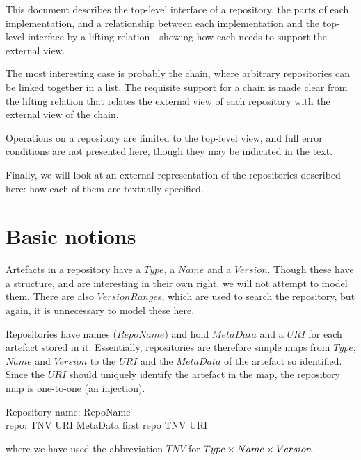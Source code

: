 \documentclass[a4paper,titlepage,twoside,12pt]{article}
\begin{document}
This document describes the top-level interface of a repository, the parts of each implementation, and a relationship between each implementation and the top-level interface by a lifting relation---showing how each needs to support the external view.

The most interesting case is probably the chain, where arbitrary repositories can be linked together in a list. The requisite support for a chain is made clear from the lifting relation that relates the external view of each repository with the external view of the chain.

Operations on a repository are limited to the top-level view, and full error conditions are not presented here, though they may be indicated in the text.

Finally, we will look at an external representation of the repositories described here: how each of them are textually specified.

\section{Basic notions}
Artefacts in a repository have a $Type$, a $Name$ and a $Version$. Though these have a structure, and are interesting in their own right, we will not attempt to model them. There are also $VersionRange$s, which are used to search the repository, but again, it is unnecessary to model these here.

Repositories have names ($RepoName$) and hold $MetaData$ and a $URI$ for each artefact stored in it. Essentially, repositories are therefore simple maps from $Type$, $Name$ and $Version$ to the $URI$ and the $MetaData$ of the artefact so identified. Since the $URI$ should uniquely identify the artefact in the map, the repository map is one-to-one (an injection).


\begin{schema}{Repository}
	name: RepoName	\\
	repo: TNV \pinj URI \cross MetaData
\where
	first \circ repo \in TNV \pinj URI
\end{schema}
where we have used the abbreviation $TNV$ for $Type \times Name\times Version$.
\end{document}

